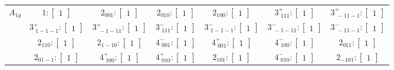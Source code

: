 \documentclass[fleqn,8pt,landscape]{jsarticle}
\begin{document}
\begin{longtable}{ccccccc}
$ A_{1g} $ & $ 1:\begin{bmatrix} 1 \end{bmatrix} $ & $ 2{}_{001}:\begin{bmatrix} 1 \end{bmatrix} $ & $ 2{}_{010}:\begin{bmatrix} 1 \end{bmatrix} $ & $ 2{}_{100}:\begin{bmatrix} 1 \end{bmatrix} $ & $ 3^{+}_{\,\,111}:\begin{bmatrix} 1 \end{bmatrix} $ & $ 3^{+}_{\,\,-11-1}:\begin{bmatrix} 1 \end{bmatrix} $ \\
& $ 3^{+}_{\,\,1-1-1}:\begin{bmatrix} 1 \end{bmatrix} $ & $ 3^{+}_{\,\,-1-11}:\begin{bmatrix} 1 \end{bmatrix} $ & $ 3^{-}_{\,\,111}:\begin{bmatrix} 1 \end{bmatrix} $ & $ 3^{-}_{\,\,1-1-1}:\begin{bmatrix} 1 \end{bmatrix} $ & $ 3^{-}_{\,\,-1-11}:\begin{bmatrix} 1 \end{bmatrix} $ & $ 3^{-}_{\,\,-11-1}:\begin{bmatrix} 1 \end{bmatrix} $ \\
& $ 2{}_{110}:\begin{bmatrix} 1 \end{bmatrix} $ & $ 2{}_{1-10}:\begin{bmatrix} 1 \end{bmatrix} $ & $ 4^{-}_{\,\,001}:\begin{bmatrix} 1 \end{bmatrix} $ & $ 4^{+}_{\,\,001}:\begin{bmatrix} 1 \end{bmatrix} $ & $ 4^{-}_{\,\,100}:\begin{bmatrix} 1 \end{bmatrix} $ & $ 2{}_{011}:\begin{bmatrix} 1 \end{bmatrix} $ \\
& $ 2{}_{01-1}:\begin{bmatrix} 1 \end{bmatrix} $ & $ 4^{+}_{\,\,100}:\begin{bmatrix} 1 \end{bmatrix} $ & $ 4^{+}_{\,\,010}:\begin{bmatrix} 1 \end{bmatrix} $ & $ 2{}_{101}:\begin{bmatrix} 1 \end{bmatrix} $ & $ 4^{-}_{\,\,010}:\begin{bmatrix} 1 \end{bmatrix} $ & $ 2{}_{-101}:\begin{bmatrix} 1 \end{bmatrix} $ \\

\end{longtable}
\end{document}
